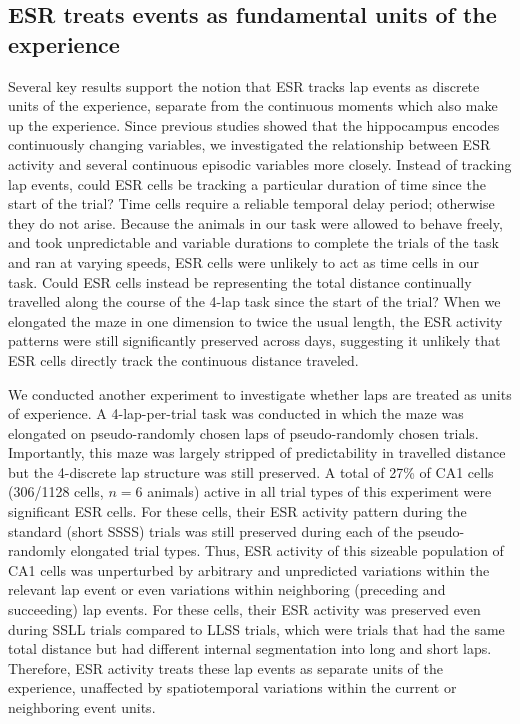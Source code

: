 \subsection{ESR treats events as fundamental units of the experience}

Several key results support the notion that ESR tracks lap events as discrete units of the experience, separate from the continuous moments which also make up the experience. Since previous studies showed that the hippocampus encodes continuously changing variables, we investigated the relationship between ESR activity and several continuous episodic variables more closely. Instead of tracking lap events, could ESR cells be tracking a particular duration of time since the start of the trial? Time cells require a reliable temporal delay period; otherwise they do not arise. Because the animals in our task were allowed to behave freely, and took unpredictable and variable durations to complete the trials of the task and ran at varying speeds, ESR cells were unlikely to act as time cells in our task. Could ESR cells instead be representing the total distance continually travelled along the course of the 4-lap task since the start of the trial? When we elongated the maze in one dimension to twice the usual length, the ESR activity patterns were still significantly preserved across days, suggesting it unlikely that ESR cells directly track the continuous distance traveled.

We conducted another experiment to investigate whether laps are treated as units of experience. A 4-lap-per-trial task was conducted in which the maze was elongated on pseudo-randomly chosen laps of pseudo-randomly chosen trials. Importantly, this maze was largely stripped of predictability in travelled distance but the 4-discrete lap structure was still preserved. A total of 27\% of CA1 cells (306/1128 cells, $n = 6$ animals) active in all trial types of this experiment were significant ESR cells. For these cells, their ESR activity pattern during the standard (short SSSS) trials was still preserved during each of the pseudo-randomly elongated trial types. Thus, ESR activity of this sizeable population of CA1 cells was unperturbed by arbitrary and unpredicted variations within the relevant lap event or even variations within neighboring (preceding and succeeding) lap events. For these cells, their ESR activity was preserved even during SSLL trials compared to LLSS trials, which were trials that had the same total distance but had different internal segmentation into long and short laps. Therefore, ESR activity treats these lap events as separate units of the experience, unaffected by spatiotemporal variations within the current or neighboring event units.


